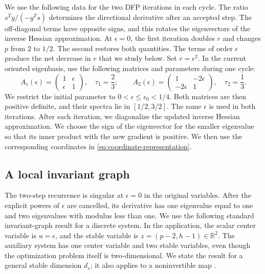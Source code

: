 \documentclass[11pt]{article}
\newcommand{\R}{\mathbb R}
\begin{document}
We use the following data for the two DFP iterations in each cycle.  The ratio
$s^Ty/(-g^Ts)$ determines the directional derivative after an accepted step.
The off-diagonal terms have opposite signs, and this rotates the eigenvectors
of the inverse Hessian approximation.  At $\epsilon=0$, the first iteration
doubles $r$ and changes $p$ from $2$ to $1/2$.  The second restores both
quantities.  The terms of order $\epsilon$ produce the net decrease in $r$
that we study below.  Set $r=\epsilon^2$.  In the current oriented eigenbasis,
use the following matrices and parameters during one cycle:
\begin{equation}\label{eq:alternating-secant-data}
A_1(\epsilon)=
\begin{pmatrix}1&\epsilon\\ \epsilon&1\end{pmatrix},
\quad \tau_1=\frac23;
\qquad
A_2(\epsilon)=
\begin{pmatrix}1&-2\epsilon\\ -2\epsilon&1\end{pmatrix},
\quad \tau_2=\frac13.
\end{equation}
We restrict the initial parameter to
$0<\epsilon\le\epsilon_0<1/4$.  Both matrices are then positive definite, and
their spectra lie in $[1/2,3/2]$.  The same $\epsilon$ is used in both
iterations.  After each iteration, we diagonalize the updated inverse Hessian
approximation.  We choose the sign of the eigenvector for the smaller
eigenvalue so that its inner product with the new gradient is positive.  We
then use the corresponding coordinates in
\eqref{eq:coordinate-representation}.

\subsection{A local invariant graph}

The two-step recurrence is singular at $\epsilon=0$ in the original
variables.  After the explicit powers of $\epsilon$ are cancelled, its
derivative has one eigenvalue equal to one and two eigenvalues with modulus
less than one.  We use the following standard invariant-graph result for a
discrete system.  In the application, the scalar center variable is
$u=\epsilon$, and the stable variable is
$z=(p-2,h-1)\in\R^2$.  The auxiliary system has one center variable and
two stable variables, even though the optimization problem itself is
two-dimensional.  We state the result for a general stable dimension $d_s$;
it also applies to a noninvertible map \cite{KarydasSchinas1992}.
\end{document}
